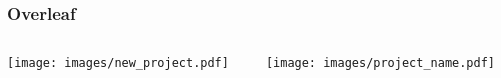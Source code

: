 \begin{frame}
	\frametitle{Overleaf}
	\begin{columns}
		\begin{column}{0.4\textwidth}
		  \texttt{[image: images/new\_project.pdf]}\hfill
		\end{column}
		\begin{column}{0.4\textwidth}
		  \texttt{[image: images/project\_name.pdf]}
		\end{column}
	\end{columns}
\end{frame}